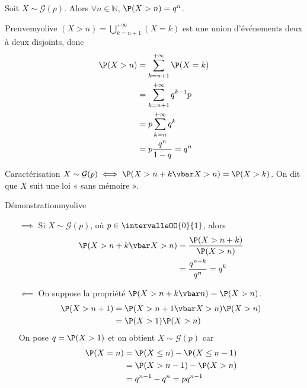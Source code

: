     \begin{prop}{}{}
        Soit $X \sim \mathcal{G}(p)$. Alors $\forall n \in \mathbb{N}$, $\P(X > n) = q^n$.
    \end{prop}

    \begin{demo}{Preuve}{myolive}
        $(X > n) = \bigcup_{k = n+1}^{+\infty} (X = k)$ est une union d’événements deux à deux disjoints, donc 
        \begin{align*}
            \P(X > n) &= \sum_{k=n+1}^{+\infty} \P(X = k) \\
            &= \sum_{k=n+1}^{+\infty} q^{k-1} p \\
            &= p \sum_{k=n}^{+\infty} q^k \\
            &= p \frac{q^n}{1 - q} = q^n
        \end{align*}
    \end{demo}

    \begin{prop}{Caractérisation}{}
        $X \sim \mathcal{G}(p) \iff \P(X > n + k \vbar X > n) = \P(X > k)$. On dit que $X$ suit une loi « sans mémoire ».
    \end{prop}

    \begin{demo}{Démonstration}{myolive}
        \begin{itemize}
            \item[$\implies$] Si $X \sim \mathcal{G}(p)$, où $p \in \intervalleOO{0}{1}$, alors 
            \begin{align*}
                \P(X > n+k \vbar X > n) &= \frac{\P( X > n+k)}{\P(X > n)} \\
                &= \frac{q^{n+k}}{q^n} = q^k
            \end{align*}
            \item[$\impliedby$] On suppose la propriété $\P(X > n+k \vbar n) = \P(X > n)$. 
            \begin{align*}
                \P(X > n+1) &= \P(X > n+1 \vbar X > n) \P(X > n) \\
                &= \P(X > 1) \P(X > n) 
            \end{align*}
            On pose $q = \P(X > 1)$ et on obtient $X \sim \mathcal{G}(p)$ car 
            \begin{align*}
                \P(X = n) &= \P(X \leq n) - \P(X \leq n-1) \\
                &= \P(X > n-1) - \P(X > n) \\
                &= q^{n-1} - q^n = p q^{n-1}
            \end{align*}
        \end{itemize}
    \end{demo}

